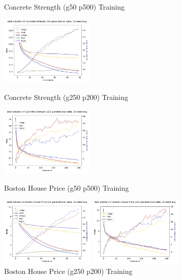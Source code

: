 \documentclass[a4paper, twocolumn]{article}
\begin{document}
\begin{figure}[!htb]
	\caption{Concrete Strength (g50 p500) Training}
	\includegraphics[width=0.40\textwidth]{Concrete Strength (50 generations)-besttrain-evo}
	\caption{Concrete Strength (g250 p200) Training}
	\includegraphics[width=0.40\textwidth]{Concrete Strength (250 generations)-besttrain-evo}
	\caption{Boston House Price (g50 p500) Training}
	\includegraphics[width=0.40\textwidth]{Boston House Price (50 generations)-besttrain-evo}
	\caption{Boston House Price (g250 p200) Training}
	\includegraphics[width=0.40\textwidth]{Boston House Price (250 generations)-besttrain-evo}
\end{figure}
\end{document}

